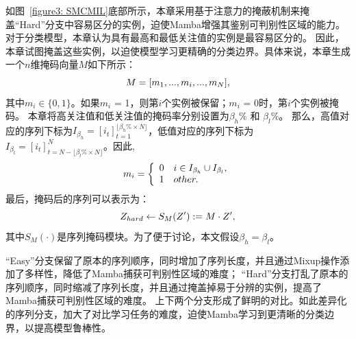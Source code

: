 如图~\ref{figure3: SMCMIL}底部所示，本章采用基于注意力的掩蔽机制来掩盖“Hard”分支中容易区分的实例，迫使Mamba增强其鉴别可判别性区域的能力。对于分类模型，本章认为具有最高和最低关注值的实例是最容易区分的。
因此，本章试图掩盖这些实例，以迫使模型学习更精确的分类边界。具体来说，本章生成一个$n$维掩码向量$M$如下所示：
  \begin{equation}
    \mathnormal{M}=[m_1,...,m_i,...,m_N],
    \label{eq11}
    \end{equation}
其中$m_i \in \{0,1\}$。如果$m_i$ = 1，则第$i$个实例被保留；$m_i$ = 0时，第$i$个实例被掩码。
本章将高关注值和低关注值的掩码率分别设置为$\beta_h\%$ 和 $\beta_l\%$。
那么，高值对应的序列下标为$I_{\beta_h}=[i_t]^{\lfloor \beta_h\%\times N \rfloor}_{t=1}$，低值对应的序列下标为 $I_{\beta_l}=[i_t]^{N}_{t=N-\lfloor \beta_l\%\times N \rfloor}$。因此,
\begin{equation}
  \mathnormal{m_i}=\left \{
  \begin{array}{cl}
      0 &  i\in I_{\beta_h} \cup  I_{\beta_l}, \\
      1 & other.
  \end{array}\right.
  \label{eq12}
  \end{equation}
最后，掩码后的序列可以表示为：
\begin{equation}
  \mathnormal{Z_{hard}}\leftarrow S_M(Z'):=M\cdot \mathnormal{Z'},
  \label{eq13}
  \end{equation}
其中$S_M(\cdot)$是序列掩码模块。为了便于讨论，本文假设$\beta_h=\beta_l$。

“Easy”分支保留了原本的序列顺序，同时增加了序列长度，并且通过Mixup操作添加了多样性，降低了Mamba捕获可判别性区域的难度；
“Hard”分支打乱了原本的序列顺序，同时缩减了序列长度，并且通过掩盖掉易于分辨的实例，提高了Mamba捕获可判别性区域的难度。
上下两个分支形成了鲜明的对比。如此差异化的序列分支，加大了对比学习任务的难度，迫使Mamba学习到更清晰的分类边界，以提高模型鲁棒性。

